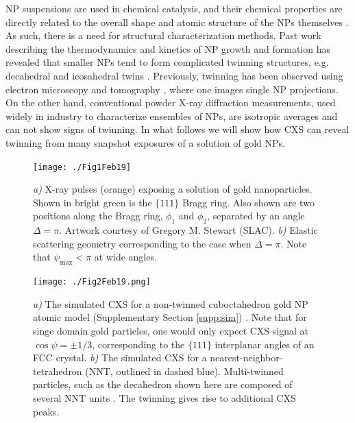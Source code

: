 \documentclass [12pt,fleqn]{article}
\begin{document}
NP suspensions are used in chemical catalysis, and their chemical properties are directly related to  the overall shape and atomic structure of the NPs themselves \cite{yacaman1981effect, narayanan2005catalysis, narayanan2004shape}. As such, there is a need for structural characterization methods. Past work describing the thermodynamics and kinetics of NP growth and formation \cite{ino1969stability, marks1983modified, howie1984elastic, marks1984surface, ringe2013kinetic} has revealed that smaller NPs tend to form complicated twinning structures, e.g. decahedral and icosahedral twins \cite{heinemann1979structure, yacaman1979structure, langille2012stepwise, yang1979crystallography, yang1979crystallography2, dai2002shapes}. Previously, twinning has been observed using electron microscopy and tomography \cite{marks1981high, yacaman1992electron, chen2013three}, where one images single NP projections. On the other hand, conventional powder X-ray diffraction measurements, used widely in industry to characterize ensembles of NPs, are isotropic averages and can not show signs of twinning. In what follows we will show how CXS can reveal twinning from many snapshot exposures of a solution of gold NPs.

\begin{figure}[H]
\begin{center}
\texttt{[image: ./Fig1Feb19]}
\end{center}
\caption{\emph{a)} X-ray pulses (orange) exposing a solution of gold nanoparticles. Shown in bright green is the $\{111\}$ Bragg ring. Also shown are two positions along the Bragg ring, $\phi_1$ and $\phi_2$, separated by an angle $\Delta=\pi$. Artwork courtesy of Gregory M. Stewart (SLAC). \emph{b)} Elastic scattering geometry corresponding to the case when $\Delta = \pi$. Note that $\psi_{\max} < \pi$ at wide angles.}
\label{fig:setup}
\end{figure}

\begin{figure}[H]
\begin{center}
\texttt{[image: ./Fig2Feb19.png]}
\end{center}
\caption{\emph{a)} The simulated CXS for a non-twinned cuboctahedron gold NP atomic model (Supplementary Section \ref{supp:sim}) . Note that for singe domain gold particles, one would only expect CXS signal at $\cos \psi  = \pm 1/3$, corresponding to the $\{111\}$ interplanar angles of an FCC crystal. \emph{b)} The simulated CXS for a nearest-neighbor-tetrahedron (NNT, outlined in dashed blue). Multi-twinned particles, such as the decahedron shown here are composed of several NNT units \cite{yang1979crystallography}. The twinning gives rise to additional CXS peaks.}
\label{fig:contrast}
\end{figure}
\end{document}
